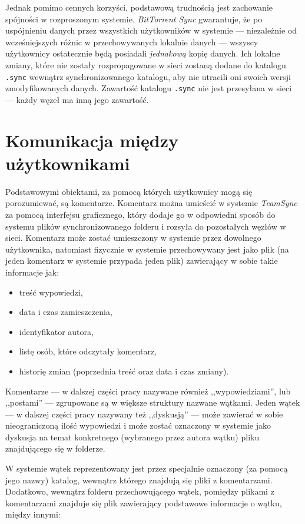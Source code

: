 Jednak pomimo cennych korzyści, podstawową trudnością jest zachowanie spójności w rozproszonym systemie. \emph{BitTorrent Sync} gwarantuje, że po uspójnieniu danych przez wszystkich użytkowników w systemie --- niezależnie od wcześniejszych różnic w przechowywanych lokalnie danych --- wszyscy użytkownicy ostatecznie będą posiadali \emph{jednakową} kopię danych. Ich lokalne zmiany, które nie zostały rozpropagowane w sieci zostaną dodane do katalogu \texttt{.sync} wewnątrz synchronizowanego katalogu, aby nie utracili oni swoich wersji zmodyfikowanych danych. Zawartość katalogu \texttt{.sync} nie jest przesyłana w sieci --- każdy węzeł ma inną jego zawartość.

\section*{Komunikacja między użytkownikami}

Podstawowymi obiektami, za pomocą których użytkownicy mogą się porozumiewać, są komentarze. Komentarz można umieścić w systemie \emph{TeamSync} za pomocą interfejsu graficznego, który dodaje go w odpowiedni sposób do systemu plików synchronizowanego folderu i rozsyła do pozostałych węzłów w sieci. Komentarz może zostać umieszczony w systemie przez dowolnego użytkownika, natomiast fizycznie w systemie przechowywany jest jako plik (na jeden komentarz w systemie przypada jeden plik) zawierający w sobie takie informacje jak:

\begin{itemize}[noitemsep]
 \item treść wypowiedzi,
 \item data i czas zamieszczenia,
 \item identyfikator autora,
 \item listę osób, które odczytały komentarz,
 \item historię zmian (poprzednia treść oraz data i czas zmiany).
\end{itemize}

Komentarze --- w dalszej części pracy nazywane również ,,wypowiedziami'', lub ,,postami'' --- zgrupowane są w większe struktury nazwane wątkami. Jeden wątek --- w dalszej części pracy nazywany też ,,dyskusją'' --- może zawierać w sobie nieograniczoną ilość wypowiedzi i może zostać oznaczony w systemie jako dyskusja na temat konkretnego (wybranego przez autora wątku) pliku znajdującego się w folderze.

W systemie wątek reprezentowany jest przez specjalnie oznaczony (za pomocą jego nazwy) katalog, wewnątrz którego znajdują się pliki z komentarzami. Dodatkowo, wewnątrz folderu przechowującego wątek, pomiędzy plikami z komentarzami znajduje się plik zawierający podstawowe informacje o wątku, między innymi:

